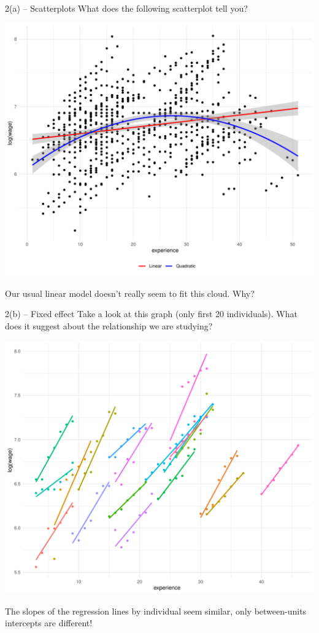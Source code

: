 \documentclass[xcolor=table,dvipsnames]{beamer}
\begin{document}
\begin{frame}{2(a) -- Scatterplots}
What does the following scatterplot tell you?
\begin{center}
\includegraphics[scale=0.33]{pictures/week_23_badscatter.pdf}
\end{center} \pause
Our usual linear model doesn't really seem to fit this cloud. Why?
\end{frame}

\begin{frame}{2(b) -- Fixed effect}
Take a look at this graph (only first 20 individuals). What does it suggest about the relationship we are studying?
\begin{center}
\includegraphics[scale=0.28]{pictures/week_23_groupline.pdf}
\end{center} \pause
The slopes of the regression lines by individual seem similar, only between-units intercepts are different!
\end{frame}
\end{document}
